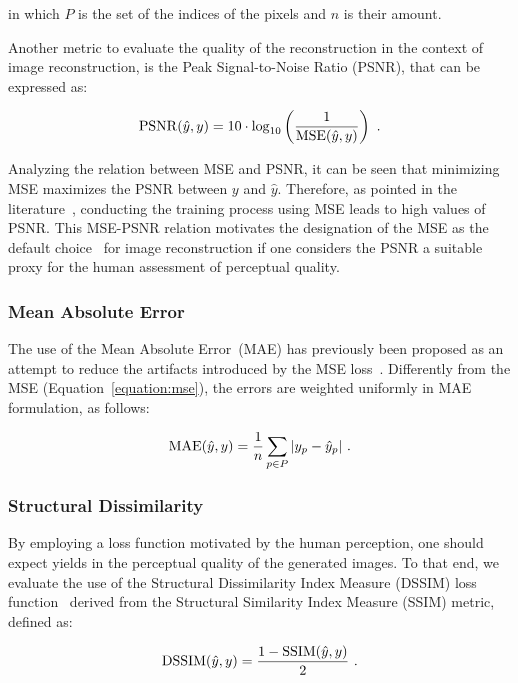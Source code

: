 \noindent in which $P$ is the set of the indices of the pixels and $n$ is their amount.

Another metric to evaluate the quality of the reconstruction in the context of image reconstruction, is the Peak Signal-to-Noise Ratio (PSNR), that can be expressed as:

\begin{equation}
  \PSNR(\hat{y}, y) = 10 \cdot \log_{10} \left( \frac{1}{\MSE(\hat{y}, y)} \right)~\text{.}
  \label{equation:psnr}
\end{equation}

Analyzing the relation between MSE and PSNR, it can be seen that minimizing MSE maximizes the PSNR between $y$ and $\hat{y}$.
Therefore, as pointed in the literature~\cite{dong2015image,johnson2016perceptual}, conducting the training process using MSE leads to high values of PSNR.
This MSE-PSNR relation motivates the designation of the MSE as the default choice~\cite{zhao2016loss} for image reconstruction if one considers the PSNR a suitable proxy for the human assessment of perceptual quality.

\subsubsection{Mean Absolute Error}

The use of the Mean Absolute Error~(MAE) has previously been proposed as an attempt to reduce the artifacts introduced by the MSE loss~\cite{zhao2016loss}. Differently from the MSE (Equation~\ref{equation:mse}), the errors are weighted uniformly in MAE formulation, as follows:

\begin{equation}
  \MAE(\hat{y}, y) = \frac{1}{n}\sum_{p \in{P}} |y_{p} - \hat{y}_{p}|~\text{.}
  \label{equation:mae}
\end{equation}

\subsubsection{Structural Dissimilarity}

By employing a loss function motivated by the human perception, one should expect yields in the perceptual quality of the generated images.
To that end, we evaluate the use of the Structural Dissimilarity Index Measure (DSSIM) loss function~\cite{zhao2016loss} derived from the Structural Similarity Index Measure (SSIM) metric, defined as:

\begin{equation}
  \operatorname{DSSIM}(\hat{y}, y) = \frac{1 - \operatorname{SSIM}(\hat{y}, y)}{2}~\text{.}
\end{equation}

